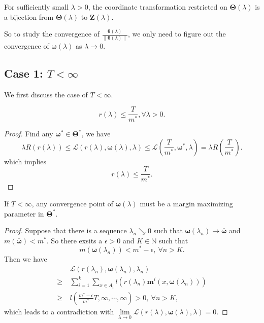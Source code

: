 \begin{lemma}
	For sufficiently small $\lambda >0$, the coordinate transformation restricted on $\bm\Theta(\lambda)$ is a bijection from $\bm\Theta(\lambda)$ to $\bm Z(\lambda)$. 
\end{lemma}


So to study the convergence of $\frac{\bm\theta(\lambda)}{\|\bm\theta(\lambda)\|}$, we only need to figure out the convergence of $\bm\omega(\lambda)$ as $\lambda\rightarrow 0$.



\subsection{Case 1: $T<\infty$}

We first discuss the case of $T<\infty$.

\begin{lemma}
	\begin{equation}
		r(\lambda) \leq \frac{T}{m^*}, \forall \lambda>0.
	\end{equation}
\end{lemma}

\begin{proof}
	Find any $\bm\omega^*\in\bm\Theta^*$, we have
	\[
	\lambda R(r(\lambda)) \leq \mathcal{L}(r(\lambda),\bm\omega(\lambda),\lambda)\leq\mathcal{L}(\frac{T}{m^*},\bm\omega^*,\lambda) = \lambda R(\frac{T}{m^*}).
	\]
	which implies
	\[
	r(\lambda) \leq \frac{T}{m^*}.
	\]
	
\end{proof}

\begin{theorem}
	If $T<\infty$, any convergence point of $\bm\omega(\lambda)$ must be a margin maximizing parameter in $\bm\Theta^*$.
\end{theorem}

\begin{proof}
	Suppose that there is a sequence $\lambda_n \searrow 0$ such that  $\bm\omega(\lambda_n)\rightarrow \overline{\bm\omega}$ and $m(\overline{\bm\omega})< m^*$. So there exsits a $\epsilon>0$ and $K\in \mathbb{N}$ such that
	\[
	m(\bm\omega(\lambda_n)) < m^* - \epsilon, \ \forall n>K.
	\]
	Then we have
	\begin{align}
	&\mathcal{L}(r(\lambda_n),\bm\omega(\lambda_n),\lambda_n) \\
	\geq\ &\sum_{i =  1}^{k} \sum_{x\in A_i} l(r(\lambda_n)\bm m^i(x,\bm\omega(\lambda_n)))\\
	\geq\ & l(\frac{m^*-\epsilon}{m^*}T,\infty,\cdots,\infty) > 0,\ \forall n>K,
	\end{align}
	which leads to a contradiction with $\lim\limits_{\lambda\rightarrow 0} \mathcal L(r(\lambda),\bm\omega(\lambda),\lambda) = 0$.
\end{proof}


